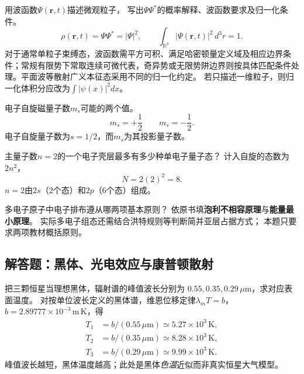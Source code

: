 \problemtext 用波函数$\Psi(\bm r,t)$描述微观粒子，
写出$\Psi\Psi^*$的概率解释、波函数要求及归一化条件。
\workings
\[
\boxed{\rho(\bm r,t)=\Psi\Psi^*=|\Psi|^2},\qquad
\boxed{\int_{\mathbb R^3}|\Psi(\bm r,t)|^2\,d^3r=1}.
\]
对于通常单粒子束缚态，波函数需平方可积、满足哈密顿量定义域及相应边界条件；常规有限势下常取连续可微代表，奇异势或无限势阱边界则按具体匹配条件处理。平面波等散射广义本征态采用不同的归一化约定。
\crosscheck 若只描述一维粒子，则归一化体积分应改为$\int|\psi(x)|^2dx$。

\problemtext 电子自旋磁量子数$m_s$可能的两个值。
\workings
\[
\boxed{m_s=+\frac12}\qquad\boxed{m_s=-\frac12}.
\]
\crosscheck 电子自旋量子数为$s=1/2$，而$m_s$为其投影量子数。

\problemtext 主量子数$n=2$的一个电子壳层最多有多少种单电子量子态？
\workings
计入自旋的态数为$2n^2$，
\[
\boxed{N=2(2)^2=8}.
\]
\crosscheck $n=2$由$2s$（2个态）和$2p$（6个态）组成。

\problemtext 多电子原子中电子排布遵从哪两项基本原则？
\workings
依原书填\textbf{泡利不相容原理}与\textbf{能量最小原理}。
\crosscheck 实际多电子组态还需结合洪特规则等判断简并亚层占据方式；
本题只要求两项教材概括原则。

\subsection{解答题：黑体、光电效应与康普顿散射}

\problemtext 把三颗恒星当理想黑体，辐射谱的峰值波长分别为
$0.55,0.35,0.29\,\mu$m，求对应表面温度。
\workings
对按单位波长定义的黑体谱，维恩位移定律$\lambda_mT=b$，
$b=2.89777\times10^{-3}\,\mathrm{m\,K}$，得
\[
\boxed{\begin{aligned}
T_1&=b/(0.55\,\mu\mathrm m)\simeq5.27\times10^3\,\mathrm K,\\
T_2&=b/(0.35\,\mu\mathrm m)\simeq8.28\times10^3\,\mathrm K,\\
T_3&=b/(0.29\,\mu\mathrm m)\simeq9.99\times10^3\,\mathrm K.
\end{aligned}}
\]
\crosscheck 峰值波长越短，黑体温度越高；此处是黑体\emph{色温}近似而非真实恒星大气模型。

